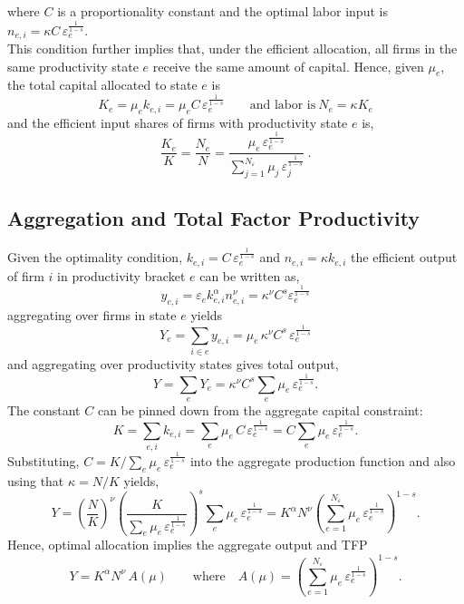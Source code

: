 \documentclass[12pt]{article}
\begin{document}
where $C$ is a proportionality constant and the optimal labor input is $n_{e,i}=\kappa C\,\varepsilon_e^{\frac{1}{1-s}}$.\vspace{3mm} \\
This condition further implies that, under the efficient allocation, all firms in the same productivity state $e$ receive the same amount of capital. Hence, given $\mu_e$, the total capital allocated to state $e$ is
$$K_e=\mu_e k_{e,i}=\mu_e C\,\varepsilon_e^{\frac{1}{1-s}} \qquad \text{and labor is} \ N_e=\kappa K_e$$  
and the efficient input shares of firms with productivity state $e$ is,
$$  \frac{K_e}{K}=\frac{N_e}{N} =\frac{\mu_e\,\varepsilon_e^{\frac{1}{1-s}}}{\sum_{j=1}^{N_\varepsilon}\mu_j\,\varepsilon_j^{\frac{1}{1-s}}}\ . $$

\bigskip

\subsection{Aggregation and Total Factor Productivity \label{sec: aggregation}} 
Given the optimality condition, $ k_{e,i} = C\,\varepsilon_e^{\frac{1}{1-s}}$ and $n_{e,i}=\kappa k_{e,i}$ the efficient output of firm $i$ in productivity bracket $e$ can be written as, 
$$ y_{e,i} = \varepsilon_e k_{e,i}^{\alpha} n_{e,i}^{\nu}  = \kappa^\nu C^s \varepsilon_{e}^{\frac{1}{1-s}} $$
aggregating over firms in state $e$ yields 
$$ Y_e = \sum_{i\in e} y_{e,i}  = \mu_e \,\kappa^{\nu} C^{s}\,\varepsilon_e^{\tfrac{1}{1-s}} $$ 
and aggregating over productivity states gives total output,
$$ Y = \sum_e Y_e = \kappa^{\nu} C^{s}\sum_e \mu_e\,\varepsilon_e^{\tfrac{1}{1-s}}. $$
The constant $C$ can be pinned down from the aggregate capital constraint:
$$ K = \sum_{e,i} k_{e,i} = \sum_e \mu_e\,C\,\varepsilon_e^{\tfrac{1}{1-s}} = C \sum_e \mu_e\,\varepsilon_e^{\tfrac{1}{1-s}}. $$
Substituting, $C = K / \sum_e \mu_e\,\varepsilon_e^{\frac{1}{1-s}}$ into the aggregate production function and also using that $\kappa = N/K$ yields,
$$
Y
= \left(\frac{N}{K}\right)^{\nu} \left(\frac{K}{\sum_e \mu_e\,\varepsilon_e^{\tfrac{1}{1-s}}}\right)^{s} \sum_e \mu_e\,\varepsilon_e^{\tfrac{1}{1-s}} = 
K^{\alpha}N^{\nu}\left(\sum_{e=1}^{N_\varepsilon}\mu_e\,\varepsilon_e^{\tfrac{1}{1-s}}\right)^{1-s}. $$
Hence, optimal allocation implies the aggregate output and TFP
$$ Y = K^{\alpha}N^{\nu}\,A(\mu) \qquad \text{where} \quad A(\mu)=\left(\sum_{e=1}^{N_\varepsilon}\mu_e\,\varepsilon_e^{\frac{1}{1-s}}\right)^{1-s} . $$

\bigskip
\end{document}
